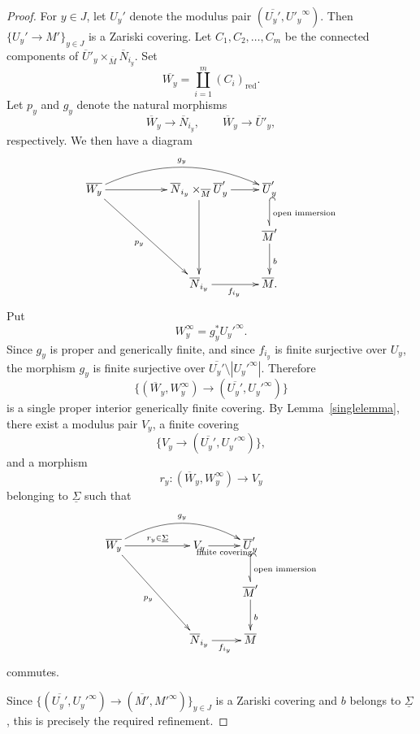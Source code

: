 \documentclass[10pt,a4paper]{amsart}
\theoremstyle{plain}
\newcommand{\ol}{\overline}
\newcommand{\ul}[1]{{\underline{#1}}}
\newcommand{\red}{{\operatorname{red}}}
\begin{document}
\begin{proof}
For $y\in J$, let $U_y'$ denote the modulus pair $(\ol{U_y'},{U'_y}^\infty)$. Then $\{U_y' \to M' \}_{y \in J}$ is a Zariski covering. Let $C_1,C_2,\dots,C_m$ be the connected components of $\ol{U}'_y\times_{\ol{M}}\ol{N}_{i_y}$. Set
\[
\ol{W_y}=\coprod_{i=1}^m (C_i)_{\red}.
\]
Let $p_{y}$ and $g_y$ denote the natural morphisms
\[
\ol{W}_y \to \ol{N}_{i_y}, \qquad \ol{W}_y \to \ol{U}'_{y},
\]
respectively. We then have a diagram
\[
\xymatrix{
\ol{W_y}\ar[rrdd]_{p_y}\ar[rr] \ar@/^20pt/[rrr]^{g_y} && \ol{N}_{i_y} \times_{\ol{M}} \ol{U}_y'  \ar[dd] \ar[r]&\ol{U}_y'\ar@{^{(}-_>}[d]^{\text{open immersion}}\\
&&&\ol{M}' \ar[d]^{b}\\
&& \ol{N}_{i_y} \ar[r]_{f_{i_y}} & \ol{M}.
}
\]
Put
\[
W_y^\infty = g_y^* {U_y'}^\infty.
\]
Since $g_y$ is proper and generically finite, and since $f_{i_y}$ is finite surjective over $U_y$, the morphism $g_y$ is finite surjective over $\ol{U_y'}\setminus |{U_y'}^\infty|$. Therefore
\[
\{(\ol{W}_{y},W_y^\infty) \to (\ol{U_y'},{U_y'}^\infty )\}
\]
is a single proper interior generically finite covering. By Lemma~\ref{singlelemma}, there exist a modulus pair $V_y$, a finite covering
\[
\{V_y \to (\ol{U_y'},{U_y'}^\infty )\},
\]
and a morphism
\[
r_y:(\ol{W}_{y},W_y^\infty) \to V_y
\]
belonging to $\ul{\Sigma}$ such that
\[
\xymatrix{
\ol{W_y}\ar[rrdd]_{p_y}\ar[rr]^-{{r_y \in \ul{\Sigma}}} \ar@/^20pt/[rrr]^{g_y} && V_y  \ar[r]_-{\text{finite covering}} &\ol{U}_y'\ar@{^{(}-_>}[d]^{\text{open immersion}}\\
&&&\ol{M}' \ar[d]^{b}\\
&& \ol{N}_{i_y} \ar[r]_{f_{i_y}} & \ol{M}
}
\]
commutes.

Since $\{(\ol{U_y'}, {U_y'}^\infty) \to (\ol{M'},M'^\infty)\}_{y\in J}$ is a Zariski covering and $b$ belongs to $\ul{\Sigma}$, this is precisely the required refinement.
\end{proof}
\end{document}
